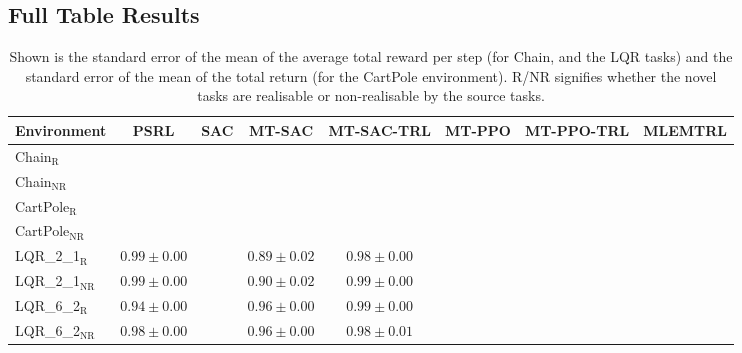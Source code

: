 \subsection{Full Table Results}
\begin{table}[t!]
    \centering
    \label{table:full_table}
    \caption{Shown is the standard error of the mean of the average total reward per step (for Chain, and the LQR tasks) and the standard error of the mean of the total return (for the CartPole environment). R/NR signifies whether the novel tasks are realisable or non-realisable by the source tasks.}
    \begin{tabular}{l | c c c c c c c }
        Environment & PSRL & SAC & MT-SAC & MT-SAC-TRL & MT-PPO & MT-PPO-TRL & MLEMTRL \\ \hline
        Chain$_\mathrm{R}$ & & & & &&&\\
        Chain$_{\mathrm{NR}}$ & & & & &&&\\
        CartPole$_\mathrm{R}$ & & & & &&&\\
        CartPole$_{\mathrm{NR}}$ & & & &&&\\
        LQR\_2\_1$_\mathrm{R}$ & $0.99 \pm 0.00$ && $0.89 \pm 0.02 $& $0.98 \pm 0.00 $ &&&\\
        LQR\_2\_1$_{\mathrm{NR}}$ & $0.99 \pm 0.00$&& $0.90\pm0.02$& $0.99 \pm 0.00 $ &&&\\
        LQR\_6\_2$_\mathrm{R}$ & $0.94 \pm 0.00$&& $0.96 \pm 0.00$& $0.99 \pm 0.00$ &&&\\
        LQR\_6\_2$_{\mathrm{NR}}$ & $0.98 \pm 0.00$&& $0.96 \pm0.00 $& $0.98 \pm 0.01 $ &&&
    \end{tabular}
\end{table}
\fi

\newpage
